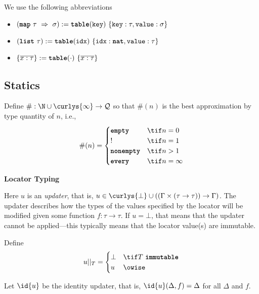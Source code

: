 \documentclass[10pt]{article}
\newcommand{\Loc}{\mathcal{L}}
\newcommand{\tableT}{\textbf{\texttt{table}}\xspace}
\begin{document}
We use the following abbreviations
\begin{itemize}
    \item $(\map~\tau~\Rightarrow~\sigma) := \tableT(\texttt{key})~\{ \texttt{key} : \tau, \texttt{value} : \sigma \}$
    \item $(\listq~\tau) := \tableT(\texttt{idx})~\{ \texttt{idx} : \natt, \texttt{value} : \tau \}$
    \item $\{ \overline{x : \tau} \} := \tableT(\cdot)~\{ \overline{x : \tau} \}$
\end{itemize}


\subsection{Statics}

Define $\# : \N \cup \curlys{\infty} \to \mathcal{Q}$ so that $\#(n)$ is the best approximation by type quantity of $n$, i.e.,
\[
    \#(n) =
    \begin{cases}
        \emptyq & \tif n = 0 \\
        \exactlyone & \tif n = 1 \\
        \nonempty & \tif n > 1 \\
        \every & \tif n = \infty \\
    \end{cases}
\]

\framebox{$\Gamma \flowproves (\Loc : \tau) ; u$} \textbf{Locator Typing}

Here $u$ is an \emph{updater}, that is, $u \in \curlys{\bot} \cup ((\Gamma \times (\tau \to \tau)) \to \Gamma)$.
The updater describes how the types of the values specified by the locator will be modified given some function $f : \tau \to \tau$.
If $u = \bot$, that means that the updater cannot be applied---this typically  means that the locator value(s) are immutable.

Define
\[
    u ||_T =
    \begin{cases}
        \bot & \tif T~\immutable \\
        u & \owise
    \end{cases}
\]

Let $\id{u}$ be the identity updater, that is, $\id{u}(\Delta, f) = \Delta$ for all $\Delta$ and $f$.

\begin{mathpar}

\end{mathpar}
\end{document}
